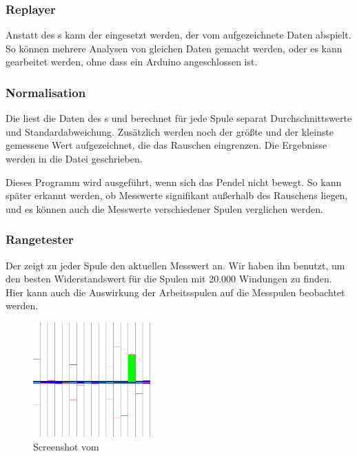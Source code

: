 \subsubsection{Replayer}
Anstatt des s kann der  eingesetzt werden, der vom  aufgezeichnete Daten abspielt.
So können mehrere Analysen von gleichen Daten gemacht werden, oder es kann gearbeitet werden, ohne dass ein Arduino angeschlossen ist.

\subsubsection{Normalisation}
Die  liest die Daten des s und berechnet für jede Spule separat Durchschnittswerte und Standardabweichung.
Zusätzlich werden noch der größte und der kleinste gemessene Wert aufgezeichnet, die das Rauschen eingrenzen.
Die Ergebnisse werden in die Datei  geschrieben.

Dieses Programm wird ausgeführt, wenn sich das Pendel nicht bewegt.
So kann später erkannt werden, ob Messwerte signifikant außerhalb des Rauschens liegen, und es können auch die Messwerte verschiedener Spulen verglichen werden.

\subsubsection{Rangetester}
Der  zeigt zu jeder Spule den aktuellen Messwert an.
Wir haben ihn benutzt, um den besten Widerstandswert für die Spulen mit 20.000 Windungen zu finden.
Hier kann auch die Auswirkung der Arbeitsspulen auf die Messpulen beobachtet werden.

\begin{figure}
  \includegraphics[width=0.4\textwidth]{images/rangetester-white_cropped.png}
  \caption{Screenshot vom }
  \label{fig:screenrangetester}
\end{figure}


